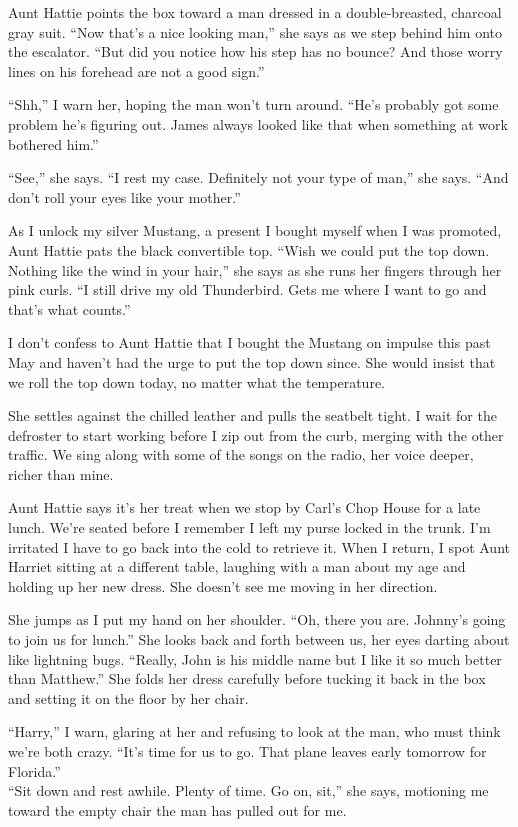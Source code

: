 \documentclass[twoside,10pt]{book}
\begin{document}
Aunt Hattie points the box toward a man dressed in a double-breasted,
charcoal gray suit. ``Now that's a nice looking man,'' she says as we
step behind him onto the escalator. ``But did you notice how his step
has no bounce? And those worry lines on his forehead are not a good
sign.''

``Shh,'' I warn her, hoping the man won't turn around. ``He's probably
got some problem he's figuring out. James always looked like that when
something at work bothered him.''

``See,'' she says. ``I rest my case. Definitely not your type of man,''
she says. ``And don't roll your eyes like your mother.''

As I unlock my silver Mustang, a present I bought myself when I was
promoted, Aunt Hattie pats the black convertible top. ``Wish we could
put the top down. Nothing like the wind in your hair,'' she says as she
runs her fingers through her pink curls. ``I still drive my old
Thunderbird. Gets me where I want to go and that's what counts.''

I don't confess to Aunt Hattie that I bought the Mustang on impulse this
past May and haven't had the urge to put the top down since. She would
insist that we roll the top down today, no matter what the temperature.

She settles against the chilled leather and pulls the seatbelt tight. I
wait for the defroster to start working before I zip out from the curb,
merging with the other traffic. We sing along with some of the songs on
the radio, her voice deeper, richer than mine.

Aunt Hattie says it's her treat when we stop by Carl's Chop House for a
late lunch. We're seated before I remember I left my purse locked in the
trunk. I'm irritated I have to go back into the cold to retrieve it.
When I return, I spot Aunt Harriet sitting at a different table,
laughing with a man about my age and holding up her new dress. She
doesn't see me moving in her direction.

She jumps as I put my hand on her shoulder. ``Oh, there you are.
Johnny's going to join us for lunch.'' She looks back and forth between
us, her eyes darting about like lightning bugs. ``Really, John is his
middle name but I like it so much better than Matthew.'' She folds her
dress carefully before tucking it back in the box and setting it on the
floor by her chair.

``Harry,'' I warn, glaring at her and refusing to look at the man, who
must think we're both crazy. ``It's time for us to go. That plane leaves
early tomorrow for Florida.''\\
``Sit down and rest awhile. Plenty of time. Go on, sit,'' she says,
motioning me toward the empty chair the man has pulled out for me.
\end{document}
